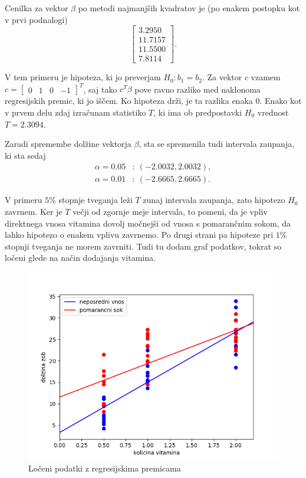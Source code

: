 \documentclass[12pt, a4paper]{article}
\begin{document}
Cenilka za vektor $\beta$ po metodi najmanjših kvadratov je (po enakem postopku kot v prvi podnalogi)
\[
\begin{bmatrix}
3.2950 \\
11.7157 \\
11.5500 \\
7.8114
\end{bmatrix}.
\]

V tem primeru je hipoteza, ki jo preverjam $H_0: b_1 = b_2$. Za vektor $c$ vzamem 
$c = \begin{bmatrix} 0 & 1 & 0 & -1 \end{bmatrix}^T$, saj tako $c^T \beta$ pove ravno razliko med naklonoma regresijskih premic, ki jo iščem. Ko hipoteza drži, je ta razlika enaka $0$. Enako kot v prvem delu zdaj izračunam statistiko $T$, ki ima ob predpostavki $H_0$ vrednost $T = 2.3094$.

Zaradi spremembe dolžine vektorja $\beta$, sta se spremenila tudi intervala zaupanja, ki sta sedaj
\begin{align*}
\alpha = 0.05 &: \ (- 2.0032, 2.0032), \\
\alpha = 0.01 &: \ (-2.6665, 2.6665).
\end{align*}

V primeru $5\%$ stopnje tveganja leži $T$ zunaj intervala zaupanja, zato hipotezo $H_0$ zavrnem. Ker je $T$ večji od zgornje meje intervala, to pomeni, da je vpliv direktnega vnosa vitamina dovolj močnejši od vnosa s pomarančnim sokom, da lahko hipotezo o enakem vplivu zavrnemo. Po drugi strani pa hipoteze pri $1\%$ stopnji tveganja ne morem zavrniti. Tudi tu dodam graf podatkov, tokrat so ločeni glede na način dodajanja vitamina.

\begin{figure}[h!]
\includegraphics[width=\linewidth]{regresijska_premica_dve.png}
\centering
\caption{Ločeni podatki z regresijskima premicama}
\end{figure}
\end{document}
